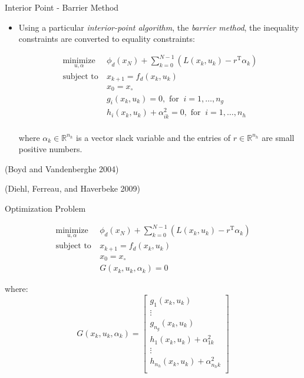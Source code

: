 \documentclass[]{beamer}
\providecommand{\tightlist}{%
  \setlength{\itemsep}{0pt}\setlength{\parskip}{0pt}}
\begin{document}
\begin{frame}{Interior Point - Barrier Method}

\begin{itemize}
\tightlist
\item
  Using a particular \emph{interior-point algorithm}, the \emph{barrier
  method}, the inequality constraints are converted to equality
  constraints:

  \begin{align*}
  \underset{u,\alpha}{\text{minimize}} &\ \phi_d(x_N)+\sum_{k=0}^{N-1}\left(L(x_k,u_k)-r^\text{T}\alpha_{k} \right)\\
  \text{subject to} &\ x_{k+1}=f_d(x_k,u_k)\\
                &\ x_0=x_\circ\\
                &\ g_i(x_k,u_k) = 0, \text{ for }\ i=1,\ldots,n_g\\
                &\ h_i(x_k,u_k) + \alpha_{ik}^2 = 0, \text{ for }\ i=1,\ldots,n_h\\
  \end{align*}

  where \(\alpha_k\in\mathbb{R}^{n_h}\) is a vector slack variable and
  the entries of \(r\in\mathbb{R}^{n_h}\) are small positive numbers.
\end{itemize}

(Boyd and Vandenberghe 2004)

\vspace{-2mm}

(Diehl, Ferreau, and Haverbeke 2009)

\end{frame}

\begin{frame}{Optimization Problem}

\begin{align*}
\underset{u,\alpha}{\text{minimize}} &\ \phi_d(x_N)+\sum_{k=0}^{N-1}\left(L(x_k,u_k)-r^\text{T}\alpha_{k} \right)\\
\text{subject to} &\ x_{k+1}=f_d(x_k,u_k)\\
                  &\ x_0=x_\circ\\
                  &\ G(x_k,u_k,\alpha_k) = 0
\end{align*}

where: \[ G(x_k,u_k,\alpha_k) = \left[\begin{array}{c}
                g_1(x_k,u_k)\\
                \vdots\\
                g_{n_g}(x_k,u_k)\\
                h_1(x_k,u_k) + \alpha_{1k}^2\\
                \vdots\\
                h_{n_h}(x_k,u_k) + \alpha_{n_hk}^2\\                
                \end{array}\right]\]

\end{frame}
\end{document}
